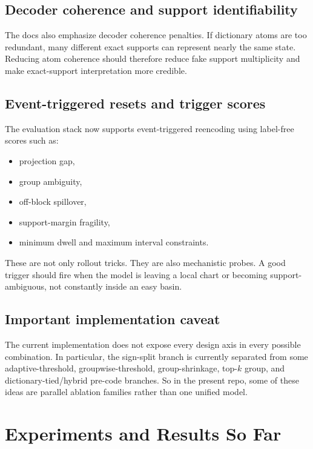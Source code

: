 \documentclass[11pt]{article}
\begin{document}
\subsection{Decoder coherence and support identifiability}

The docs also emphasize decoder coherence penalties. If dictionary atoms are
too redundant, many different exact supports can represent nearly the same
state. Reducing atom coherence should therefore reduce fake support
multiplicity and make exact-support interpretation more credible.

\subsection{Event-triggered resets and trigger scores}

The evaluation stack now supports event-triggered reencoding using label-free
scores such as:
\begin{itemize}[leftmargin=1.5em]
    \item projection gap,
    \item group ambiguity,
    \item off-block spillover,
    \item support-margin fragility,
    \item minimum dwell and maximum interval constraints.
\end{itemize}

These are not only rollout tricks. They are also mechanistic probes. A good
trigger should fire when the model is leaving a local chart or becoming
support-ambiguous, not constantly inside an easy basin.

\subsection{Important implementation caveat}

The current implementation does not expose every design axis in every possible
combination. In particular, the sign-split branch is currently separated from
some adaptive-threshold, groupwise-threshold, group-shrinkage, top-$k$ group,
and dictionary-tied/hybrid pre-code branches. So in the present repo, some of
these ideas are parallel ablation families rather than one unified model.

\section{Experiments and Results So Far}
\end{document}
